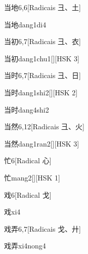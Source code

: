\begin{entry}{当地}{6,6}[Radicais ⼹、⼟]
  \begin{phonetics}{当地}{dang1di4}
  \end{phonetics}
\end{entry}

\begin{entry}{当初}{6,7}[Radicais ⼹、⾐]
  \begin{phonetics}{当初}{dang1chu1}[][HSK 3]
  \end{phonetics}
\end{entry}

\begin{entry}{当时}{6,7}[Radicais ⼹、⽇]
  \begin{phonetics}{当时}{dang1shi2}[][HSK 2]
  \end{phonetics}
  \begin{phonetics}{当时}{dang4shi2}
  \end{phonetics}
\end{entry}

\begin{entry}{当然}{6,12}[Radicais ⼹、⽕]
  \begin{phonetics}{当然}{dang1ran2}[][HSK 3]
  \end{phonetics}
\end{entry}

\begin{entry}{忙}{6}[Radical ⼼]
  \begin{phonetics}{忙}{mang2}[][HSK 1]
  \end{phonetics}
\end{entry}

\begin{entry}{戏}{6}[Radical ⼽]
  \begin{phonetics}{戏}{xi4}
  \end{phonetics}
\end{entry}

\begin{entry}{戏弄}{6,7}[Radicais ⼽、⼶]
  \begin{phonetics}{戏弄}{xi4nong4}
  \end{phonetics}
\end{entry}

